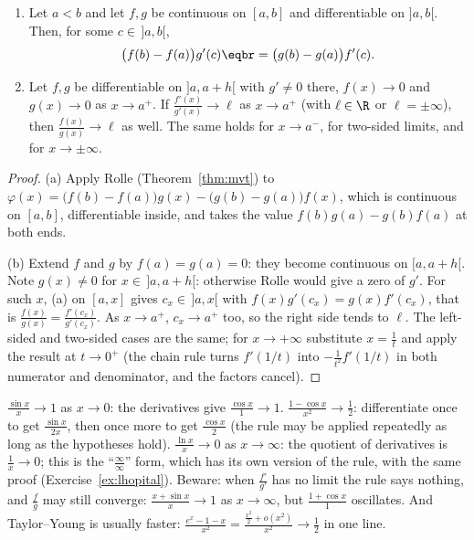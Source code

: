 \begin{theorem}\label{thm:lhopital}
\begin{enumerate}[label=(\alph*)]
\item Let $a<b$ and let $f,g$ be continuous on $[a,b]$ and differentiable on $]a,b[$. Then, for some $c\in\,]a,b[$,
\[\begin{aligned}\bigl(f(b)-f(a)\bigr)g'(c)\eqbr=\bigl(g(b)-g(a)\bigr)f'(c).\end{aligned}\]
\item Let $f,g$ be differentiable on $]a,a+h[$ with $g'\ne0$ there, $f(x)\to0$ and $g(x)\to0$ as $x\to a^+$. If $\frac{f'(x)}{g'(x)}\to\ell$ as $x\to a^+$ (with $\ell\in\R$ or $\ell=\pm\infty$), then $\frac{f(x)}{g(x)}\to\ell$ as well. The same holds for $x\to a^-$, for two-sided limits, and for $x\to\pm\infty$.
\end{enumerate}
\end{theorem}
\begin{proof}
(a) Apply Rolle (Theorem~\ref{thm:mvt}) to $\varphi(x)=\bigl(f(b)-f(a)\bigr)g(x)-\bigl(g(b)-g(a)\bigr)f(x)$, which is continuous on $[a,b]$, differentiable inside, and takes the value $f(b)g(a)-g(b)f(a)$ at both ends.

(b) Extend $f$ and $g$ by $f(a)=g(a)=0$: they become continuous on $[a,a+h[$. Note $g(x)\ne0$ for $x\in\,]a,a+h[$: otherwise Rolle would give a zero of $g'$. For such $x$, (a) on $[a,x]$ gives $c_x\in\,]a,x[$ with $f(x)g'(c_x)=g(x)f'(c_x)$, that is $\frac{f(x)}{g(x)}=\frac{f'(c_x)}{g'(c_x)}$. As $x\to a^+$, $c_x\to a^+$ too, so the right side tends to $\ell$. The left-sided and two-sided cases are the same; for $x\to+\infty$ substitute $x=\frac1t$ and apply the result at $t\to0^+$ (the chain rule turns $f'(1/t)$ into $-\frac1{t^2}f'(1/t)$ in both numerator and denominator, and the factors cancel).
\end{proof}

\begin{examplex}
$\frac{\sin x}x\to1$ as $x\to0$: the derivatives give $\frac{\cos x}1\to1$. $\frac{1-\cos x}{x^2}\to\frac12$: differentiate once to get $\frac{\sin x}{2x}$, then once more to get $\frac{\cos x}2$ (the rule may be applied repeatedly as long as the hypotheses hold). $\frac{\ln x}{x}\to0$ as $x\to\infty$: the quotient of derivatives is $\frac1x\to0$; this is the ``$\frac\infty\infty$'' form, which has its own version of the rule, with the same proof (Exercise~\ref{ex:lhopital}). Beware: when $\frac{f'}{g'}$ has no limit the rule says nothing, and $\frac fg$ may still converge: $\frac{x+\sin x}x\to1$ as $x\to\infty$, but $\frac{1+\cos x}1$ oscillates. And Taylor--Young is usually faster: $\frac{e^x-1-x}{x^2}=\frac{\frac{x^2}2+o(x^2)}{x^2}\to\frac12$ in one line.
\end{examplex}

